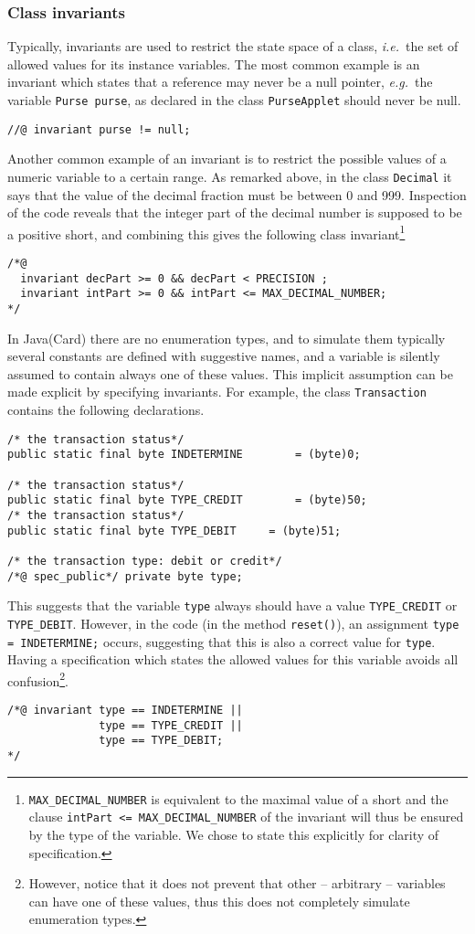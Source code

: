 \documentclass[a4paper]{llncs}
\begin{document}
\subsubsection{Class invariants}
Typically, invariants are used to restrict the state space of a class,
\emph{i.e.}~the set of allowed values for its instance variables. The
most common example is an invariant which states that a reference may
never be a null pointer, \emph{e.g.}~the variable
\texttt{Purse purse}, as declared in the class \texttt{PurseApplet}
should never be null.
\begin{verbatim}
//@ invariant purse != null;
\end{verbatim}
Another common example of an invariant is to restrict the possible
values of a numeric variable to a certain range. As remarked above, in
the class \texttt{Decimal} it says that the value of the decimal
fraction must be between 0 and 999. Inspection of the code reveals 
that the integer part of the decimal number is supposed to be a
positive short, and combining this gives the following class
invariant\footnote{\texttt{MAX\_DECIMAL\_NUMBER} is equivalent to the
maximal value of a short and the clause \texttt{intPart <=
MAX\_DECIMAL\_NUMBER} of the invariant will thus be
ensured by the type of the variable. We chose to state this explicitly
for clarity of specification.}
\begin{verbatim}
/*@
  invariant decPart >= 0 && decPart < PRECISION ;
  invariant intPart >= 0 && intPart <= MAX_DECIMAL_NUMBER;
*/
\end{verbatim}

In Java(Card) there are no enumeration types, and to simulate them
typically several constants are defined with suggestive names, and a
variable is silently assumed to contain always one of these
values. This implicit assumption can be made explicit by specifying
invariants. For example, the class \texttt{Transaction} contains the
following declarations.
\begin{verbatim}
/* the transaction status*/
public static final byte INDETERMINE		= (byte)0;

/* the transaction status*/
public static final byte TYPE_CREDIT		= (byte)50;
/* the transaction status*/
public static final byte TYPE_DEBIT		= (byte)51;
    
/* the transaction type: debit or credit*/
/*@ spec_public*/ private byte type;
\end{verbatim}

This suggests that the variable \texttt{type} always should have a
value \texttt{TYPE\_CREDIT} or \texttt{TYPE\_DEBIT}. However, in the
code (in the method \texttt{reset()}), an assignment \texttt{type =
INDETERMINE;} occurs, suggesting that this is also a correct value for 
\texttt{type}. Having a specification which states the allowed values
for this variable avoids all confusion\footnote{However, notice that it 
does not prevent that other -- arbitrary -- variables can have one of
these values, thus this does not completely simulate enumeration
types.}.
\begin{verbatim}
/*@ invariant type == INDETERMINE ||
              type == TYPE_CREDIT || 
              type == TYPE_DEBIT;
*/
\end{verbatim}
\end{document}

